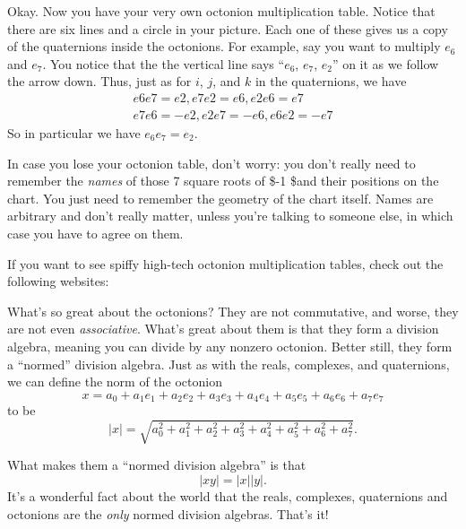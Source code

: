 \documentclass{article}
\renewcommand{\texttt}[1]{%
  \begingroup
  \ttfamily
  \begingroup\lccode`~=`/\lowercase{\endgroup\def~}{/\discretionary{}{}{}}%
  \begingroup\lccode`~=`[\lowercase{\endgroup\def~}{[\discretionary{}{}{}}%
  \begingroup\lccode`~=`.\lowercase{\endgroup\def~}{.\discretionary{}{}{}}%
  \catcode`/=\active\catcode`[=\active\catcode`.=\active
  \scantokens{#1\noexpand}%
  \endgroup
}
\begin{document}
Okay. Now you have your very own octonion multiplication table. Notice
that there are six lines and a circle in your picture. Each one of these
gives us a copy of the quaternions inside the octonions. For example,
say you want to multiply \(e_6\) and \(e_7\). You notice that the the
vertical line says ``\(e_6\), \(e_7\), \(e_2\)'' on it as we follow the
arrow down. Thus, just as for \(i\), \(j\), and \(k\) in the
quaternions, we have \[
  \begin{gathered}
    e6 e7 =  e2,   e7 e2 =  e6,   e2 e6 =  e7
  \\e7 e6 = -e2,   e2 e7 = -e6,   e6 e2 = -e7
  \end{gathered}
\] So in particular we have \(e_6 e_7 = e_2\).

In case you lose your octonion table, don't worry: you don't really need
to remember the \emph{names} of those 7 square roots of \$-1 \$and their
positions on the chart. You just need to remember the geometry of the
chart itself. Names are arbitrary and don't really matter, unless you're
talking to someone else, in which case you have to agree on them.

If you want to see spiffy high-tech octonion multiplication tables,
check out the following websites:


What's so great about the octonions? They are not commutative, and
worse, they are not even \emph{associative}. What's great about them is
that they form a division algebra, meaning you can divide by any nonzero
octonion. Better still, they form a ``normed'' division algebra. Just as
with the reals, complexes, and quaternions, we can define the norm of
the octonion
\[x = a_0 + a_1 e_1 + a_2 e_2 + a_3 e_3 + a_4 e_4 + a_5 e_5 + a_6 e_6 + a_7 e_7\]
to be
\[|x| = \sqrt{a_0^2 + a_1^2 + a_2^2 + a_3^2 + a_4^2 + a_5^2 + a_6^2 + a_7^2}.\]

What makes them a ``normed division algebra'' is that \[|xy| = |x||y|.\]
It's a wonderful fact about the world that the reals, complexes,
quaternions and octonions are the \emph{only} normed division algebras.
That's it!
\end{document}
